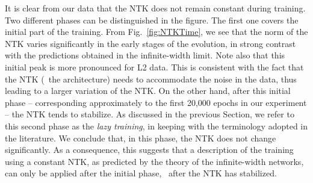 It is clear from our data that the NTK does not remain constant during training. 
Two different phases can be distinguished in the figure. The first one
covers the initial part of the training. From Fig.~\ref{fig:NTKTime}, we see
that the norm of the NTK varies significantly in the early stages of the evolution, in strong contrast with 
the predictions obtained in the infinite-width limit. Note also that this
initial peak is more pronounced for L2 data. This is consistent with the fact
that the NTK (\ie\ the architecture) needs to accommodate the noise in
the data, thus leading to a larger variation of the NTK. On the other hand,
after this initial phase -- corresponding approximately to the first 20,000 epochs in our experiment --
the NTK tends to stabilize. As discussed in the previous Section, we refer to this
second phase as the \textit{lazy training}, in keeping with the terminology
adopted in the literature. We conclude that, in this phase, the NTK does not
change significantly. As a consequence, this suggests that a description of 
the training using a constant NTK, as predicted by the theory of the
infinite-width networks, can only be applied after the initial
phase, \ie\ after the NTK has stabilized. 

\FloatBarrier


